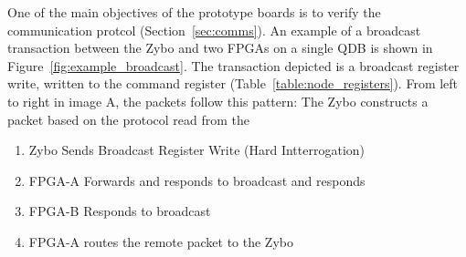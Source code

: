 One of the main objectives of the prototype boards is to verify the communication protcol (Section~\ref{sec:comms}).
An example of a broadcast transaction between the Zybo and two FPGAs on a single QDB is shown in Figure~\ref{fig:example_broadcast}.
The transaction depicted is a broadcast register write, written to the command register (Table~\ref{table:node_registers}).
From left to right in image A, the packets follow this pattern:
The Zybo constructs a packet based on the protocol read from the 

\begin{enumerate}
  \item Zybo Sends Broadcast Register Write (Hard Intterrogation)
  \item FPGA-A Forwards and responds to broadcast and responds
  \item FPGA-B Responds to broadcast 
  \item FPGA-A routes the remote packet to the Zybo
\end{enumerate}

